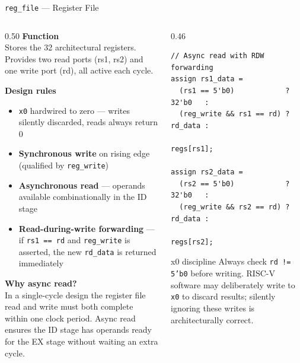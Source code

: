 \documentclass[aspectratio=169,10pt]{beamer}
\begin{document}
\begin{frame}[fragile]{\texttt{reg\_file} --- Register File}
  \begin{columns}[T]
    \begin{column}{0.50\textwidth}
      \textbf{Function}\\
      Stores the 32 architectural registers.
      Provides two read ports (rs1, rs2) and one write port (rd), all active each cycle.

      \vspace{0.5em}
      \textbf{Design rules}
      \begin{itemize}\small
        \item \texttt{x0} hardwired to zero --- writes silently discarded, reads always return 0
        \item \textbf{Synchronous write} on rising edge (qualified by \texttt{reg\_write})
        \item \textbf{Asynchronous read} --- operands available combinationally in the ID stage
        \item \textbf{Read-during-write forwarding} --- if \texttt{rs1 == rd} and \texttt{reg\_write} is asserted, the new \texttt{rd\_data} is returned immediately
      \end{itemize}

      \vspace{0.5em}
      \textbf{Why async read?}\\
      In a single-cycle design the register file read and write must both complete within one clock period. Async read ensures the ID stage has operands ready for the EX stage without waiting an extra cycle.
    \end{column}
    \begin{column}{0.46\textwidth}
\begin{lstlisting}
// Async read with RDW forwarding
assign rs1_data =
  (rs1 == 5'b0)            ? 32'b0   :
  (reg_write && rs1 == rd) ? rd_data :
                             regs[rs1];

assign rs2_data =
  (rs2 == 5'b0)            ? 32'b0   :
  (reg_write && rs2 == rd) ? rd_data :
                             regs[rs2];
\end{lstlisting}
      \vspace{0.4em}
      \begin{alertblock}{x0 discipline}
        \small
        Always check \texttt{rd != 5'b0} before writing. RISC-V software may deliberately write to \texttt{x0} to discard results; silently ignoring these writes is architecturally correct.
      \end{alertblock}
    \end{column}
  \end{columns}
\end{frame}
\end{document}
